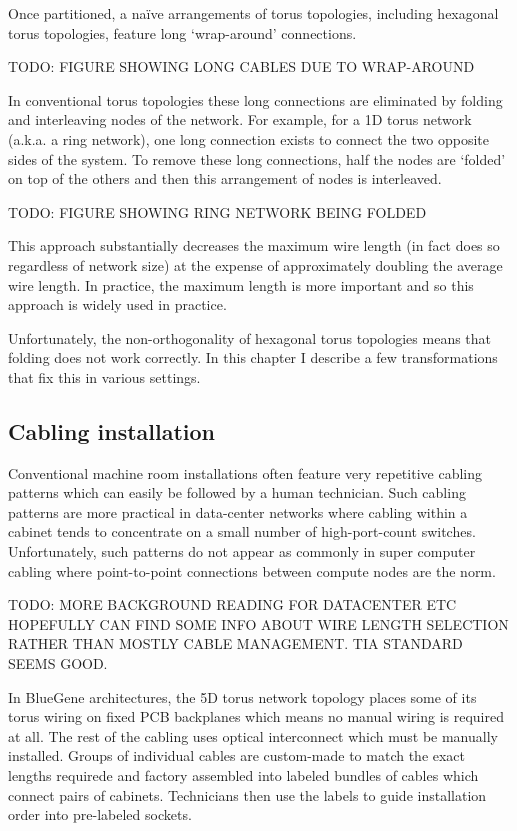 			Once partitioned, a na\"ive arrangements of torus topologies, including
			hexagonal torus topologies, feature long `wrap-around' connections.
			
			TODO: FIGURE SHOWING LONG CABLES DUE TO WRAP-AROUND
			
			In conventional torus topologies these long connections are eliminated by
			folding and interleaving nodes of the network. For example, for a 1D
			torus network (a.k.a. a ring network), one long connection exists to
			connect the two opposite sides of the system. To remove these long
			connections, half the nodes are `folded' on top of the others and then
			this arrangement of nodes is interleaved.
			
			TODO: FIGURE SHOWING RING NETWORK BEING FOLDED
			
			This approach substantially decreases the maximum wire length (in fact
			does so regardless of network size) at the expense of approximately
			doubling the average wire length. In practice, the maximum length is more
			important and so this approach is widely used in practice.
			
			Unfortunately, the non-orthogonality of hexagonal torus topologies means
			that folding does not work correctly. In this chapter I describe a few
			transformations that fix this in various settings.
		
		\subsection{Cabling installation}
			
			Conventional machine room installations often feature very repetitive
			cabling patterns which can easily be followed by a human technician.
			Such cabling patterns are more practical in data-center networks where
			cabling within a cabinet tends to concentrate on a small number of
			high-port-count switches. Unfortunately, such patterns do not appear as
			commonly in super computer cabling where point-to-point connections
			between compute nodes are the norm.
			
			TODO: MORE BACKGROUND READING FOR DATACENTER ETC HOPEFULLY CAN FIND SOME
			INFO ABOUT WIRE LENGTH SELECTION RATHER THAN MOSTLY CABLE MANAGEMENT. TIA
			STANDARD SEEMS GOOD.
			
			In BlueGene architectures, the 5D torus network topology places some of
			its torus wiring on fixed PCB backplanes which means no manual wiring is
			required at all. The rest of the cabling uses optical interconnect which
			must be manually installed. Groups of individual cables are custom-made
			to match the exact lengths requirede and factory assembled into labeled
			bundles of cables which connect pairs of cabinets. Technicians then use
			the labels to guide installation order into pre-labeled sockets.
			
